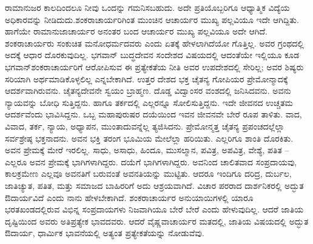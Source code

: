 ರಾಮಾನುಜರ ಕಾಲದಿಂದಲೂ ನೀವು ಒಂದನ್ನು ಗಮನಿಸಬಹುದು. ಅದೇ ಪ್ರತಿಯೊಬ್ಬರಿಗೂ ಆಧ್ಯಾತ್ಮಿಕ ವಿದ್ಯೆಯ ಅಧಿಕಾರವನ್ನು ನೀಡಿದುದು.\break ಶಂಕರಾಚಾರ್ಯರಿಗಿಂತ ಮುಂಚಿನ ಆಚಾರ್ಯರ ಮುಖ್ಯ ಪಲ್ಲವಿಯೂ ಇದೇ ಆಗಿದ್ದಿತು. ಹಾಗೆಯೇ ರಾಮಾನುಜಾಚಾರ್ಯರ ಅನಂತರ ಬಂದ ಆಚಾರ್ಯರ ಮುಖ್ಯ ಪಲ್ಲವಿಯೂ ಅದೇ ಆಗಿದೆ. ಶಂಕರಾಚಾರ್ಯರು ಸಂಕುಚಿತ ಮನೋಧರ್ಮದವರು ಎಂದು ಏತಕ್ಕೆ ಹೇಳಲಾಗಿದೆಯೋ ಗೊತ್ತಿಲ್ಲ. ಅವರ ಗ್ರಂಥದಲ್ಲಿ ಅದಕ್ಕೆ ಆಧಾರ ದೊರಕುವುದಿಲ್ಲ. ಭಗವಾನ್​ ಬುದ್ಧದೇವನ ಸಂದೇಶದ ವಿಷಯದಲ್ಲಿ ಆದಂತೆಯೇ ಇಲ್ಲಿಯೂ ಕೂಡ ಭಗವಾನ್​ ಶಂಕರಾಚಾರ್ಯರಿಗೆ ಆರೋಪಿಸುವ ಈ ಪ್ರತ್ಯೇಕತೆಯ ನೀತಿ ಅವರ ಉಪದೇಶದಲ್ಲಿ ಸೇರಿಲ್ಲ; ಅವರ ಶಿಷ್ಯರು ಸರಿಯಾಗಿ ಅರ್ಥಮಾಡಿಕೊಳ್ಳಲಿಲ್ಲ ಎನ್ನಬೇಕಾಗಿದೆ. ಉತ್ತರ ದೇಶದ ಭಕ್ತ ಚೈತನ್ಯ ಗೋಪಿಯರ ಪ್ರೇಮೋನ್ಮಾದಕ್ಕೆ ಆದರ್ಶವಾಗಿರುವನು. ಚೈತನ್ಯದೇವನೇ ಸ್ವಯಂ ಬ್ರಾಹ್ಮಣ. ದೊಡ್ಡ ವಿದ್ವಾಂಸರ ವಂಶದಲ್ಲಿ ಜನಿಸಿದವನು. ಅವನು ನ್ಯಾಯವನ್ನು ಬೋಧಿ ಸುತ್ತಿದ್ದನು. ಹಾಗೂ ತರ್ಕದಲ್ಲಿ ಎಲ್ಲರನ್ನೂ ಸೋಲಿಸುತ್ತಿದ್ದನು. ಇದೇ ಜೀವನದ ಉಚ್ಚತಮ ಆದರ್ಶವೆಂದು ಭಾವಿಸಿದ್ದನು. ಒಬ್ಬ ಮಹಾಪುರುಷರ ದಯೆಯಿಂದ ಇವನ ಜೀವನವೇ ಬೇರೆ ರೂಪ ತಾಳಿತು. ವಾದ, ವಿವಾದ, ತರ್ಕ, ನ್ಯಾಯ, ಅಧ್ಯಾಪನ, ಮುಂತಾದುವನ್ನೆಲ್ಲ ತ್ಯಜಿಸಿದನು. ಪ್ರೇಮೋನ್ಮತ್ತ ಚೈತನ್ಯ ಪ್ರಪಂಚದಲ್ಲೆಲ್ಲಾ ಸರ್ವಶ್ರೇಷ್ಠ ಭಕ್ತನಾದನು. ಅವನ ಭಕ್ತಿ ತರಂಗ ಭೂಮಿಯ ಮೇಲೆಲ್ಲಾ ಹರಿಯಿತು. ಎಲ್ಲರಿಗೂ ಶಾಂತಿ ದೊರಕಿತು. ಅವನ ಪ್ರೇಮಕ್ಕೆ ಮೇರೆ ಇರಲಿಲ್ಲ. ಸಾಧು, ಅಸಾಧು, ಹಿಂದೂ, ಮುಸಲ್ಮಾನ, ಪವಿತ್ರ, ಅಪವಿತ್ರ, ವೇಶ್ಯೆ, ಪತಿತ – ಎಲ್ಲರೂ ಅವನ ಪ್ರೇಮಕ್ಕೆ ಭಾಗಿಗಳಾಗಿದ್ದರು. ದಯೆಗೆ ಭಾಗಿಗಳಾಗಿದ್ದರು. ಅವನಿಂದ ಚಾಲಿತವಾದ ಸಂಪ್ರದಾಯವು, ಕಾಲಕ್ರಮೇಣ ಎಲ್ಲವೂ ಅವನತಿಗೆ ಬರುವಂತೆ ಅವನತಿಯನ್ನು ಮುಟ್ಟಿತು. ಆದರೂ ಇಂದಿಗೂ ದರಿದ್ರ, ದುರ್ಬಲ, ಜಾತಿಚ್ಯುತ, ಪತಿತ, ಮತ್ತು ಸಮಾಜದ ಬಾಹಿರರಿಗೆ ಅದು ಆಶ್ರಯವಾಗಿದೆ. ವಿಚಾರ ಪರರಾದ ದಾರ್ಶನಿಕರಲ್ಲಿ ಅದ್ಭುತ ಔದಾರ್ಯವಿದೆ ಎಂದು ನಾನು ಹೇಳಬೇಕಾಗಿದೆ. ಶಂಕರಾಚಾರ್ಯರ ಅನುಯಾಯಿಗಳಲ್ಲಿ ಯಾರೂ ಭರತಖಂಡದಲ್ಲಿರುವ ವಿಭಿನ್ನ ಸಂಪ್ರದಾಯಗಳು ನಿಜವಾಗಿಯೂ ಬೇರೆ ಬೇರೆ ಎಂದು ಹೇಳುವುದಿಲ್ಲ. ಆದರೆ ಜಾತಿಯ ದೃಷ್ಟಿಯಿಂದ ಅವರು ಅತಿಪ್ರತ್ಯೇಕ ಭಾವದವರು. ಆದರೆ ವೈಷ್ಣವಾಚಾರ್ಯರ ಮತದಲ್ಲಿ, ಜಾತಿಯ ವಿಷಯದಲ್ಲಿ ಅದ್ಭುತ ಔದಾರ್ಯ, ಧಾರ್ಮಿಕ ಭಾವನೆಯಲ್ಲಿ ಅತ್ಯಂತ ಪ್ರತ್ಯೇಕತೆಯನ್ನು ನೋಡುವೆವು.

